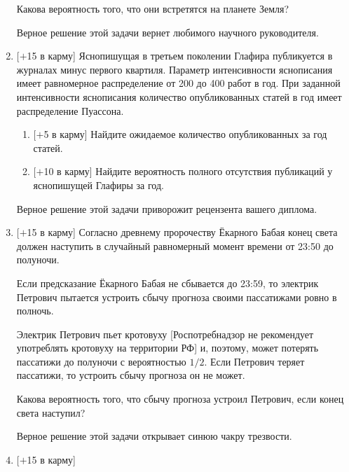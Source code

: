 \documentclass[12pt]{article}
\begin{document}
\begin{enumerate}[resume]
    Какова вероятность того, что они встретятся на планете Земля?
    
    
    Верное решение этой задачи вернет любимого научного руководителя.
    
    \item  $[+$15 в карму] 
    Яснопишущая в третьем поколении Глафира публикуется в журналах 
    минус первого квартиля. 
    Параметр интенсивности яснописания имеет равномерное распределение от 200 до 400 работ в год. 
    При заданной интенсивности яснописания количество опубликованных статей в год имеет распределение Пуассона. 
    
    \begin{enumerate}
        \item $[+$5 в карму] Найдите ожидаемое количество опубликованных за год статей.
        \item $[+$10 в карму] Найдите вероятность полного отсутствия публикаций у яснопишущей Глафиры за год.
    \end{enumerate}
    
    
    Верное решение этой задачи приворожит рецензента вашего диплома. 
    \newpage
    \item  $[+$15 в карму] 
    Согласно древнему пророчеству Ёкарного Бабая конец света
    должен наступить в случайный равномерный момент времени от 23:50 до полуночи.
    
    Если предсказание Ёкарного Бабая не сбывается до 23:59, 
    то электрик Петрович пытается устроить сбычу
    прогноза своими пассатижами ровно в полночь. 

    
    Электрик Петрович пьет кротовуху [Роспотребнадзор не рекомендует употреблять кротовуху на территории РФ] и, поэтому, может потерять пассатижи до полуночи с вероятностью $1/2$. Если Петрович теряет пассатижи, то устроить сбычу прогноза он не может. 
    
    Какова вероятность того, что сбычу прогноза устроил Петрович,
    если конец света наступил?

    
    Верное решение этой задачи открывает синюю чакру трезвости.     

    \item  $[+$15 в карму] 
    

\end{enumerate}
\end{document}
